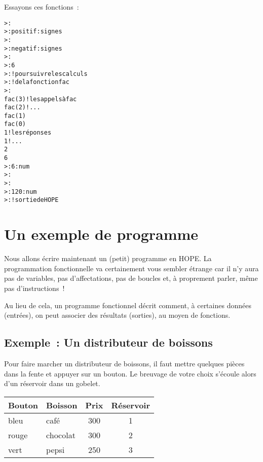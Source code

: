 Essayons ces fonctions~:
\begin{alltt}
>: 
>:  positif  : signes
>: 
>:  negatif  : signes
>: 
>: 6
>:                                     ! pour suivre les calculs
>:                                    ! de la fonction fac
>: 
 fac ( 3)                                       ! les appels à fac
 fac ( 2)                                       ! ...
 fac ( 1)
 fac ( 0)
 1                                              ! les réponses
 1                                              ! ...
 2
 6
>:  6 : num
>: 
>: 
>:  120 : num
>:                                         ! sortie de HOPE
\end{alltt}


\section{Un exemple de programme}

Nous allons écrire maintenant un (petit) programme en HOPE. La
programmation fonctionnelle va certainement vous sembler étrange car
il n'y aura pas de variables, pas d'affectations, pas de boucles et,
à proprement parler, même pas d'instructions~!

Au lieu de cela, un programme fonctionnel décrit comment, à
 certaines données (entrées), on peut associer des résultats
 (sorties), au moyen de fonctions.


\subsection{Exemple~: Un distributeur de boissons}

Pour faire marcher un distributeur de boissons, il faut mettre
quelques pièces dans la fente et appuyer sur un bouton.  Le breuvage
de votre choix s'écoule alors d'un réservoir dans un gobelet.

\bigskip
\begin{center}
\begin{tabular}{llcc}
\hline
	Bouton &	Boisson & Prix &  Réservoir	\\
\hline 

bleu &	café &		300		&	1 \\
rouge &	chocolat & 	300 &		2\\
		vert &	pepsi & 		250 &		3\\
\hline
\end{tabular}
\end{center}
\bigskip

